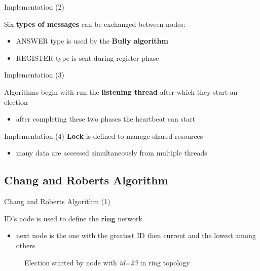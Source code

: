 \documentclass{beamer}
\begin{document}
	 \begin{frame}{Implementation (2)}
	 	 
	 	 Six \textbf{types of messages} can be exchanged between nodes:
	 	 
	 	 \lstIII
	 	 
	 	 \begin{itemize}
	 	     \item ANSWER type is used by the \textbf{Bully algorithm} 
	 	     \item REGISTER type is sent during register phase
	 	 \end{itemize}
	 	 
	 	 \end{frame}
	 	
	 \begin{frame}{Implementation (3)}
	 
	 Algorithms begin with run the \textbf{listening thread} after which they start an election
	 \begin{itemize}
	     \item after completing these two phases the heartbeat can start
	 \end{itemize}
    
    \lstIV
	     
	 \end{frame}
	 
	 \begin{frame}{Implementation (4)}
	     \textbf{Lock} is defined to manage shared resources
	     \begin{itemize}
	         \item many data are accessed simultaneously from multiple threads 
	     \end{itemize}
	     
	     \begin{center}
	     \lstV
	     \end{center}


	 \end{frame}
	 
	 \subsection{Chang and Roberts Algorithm}
	 
	 \begin{frame}{Chang and Roberts Algorithm (1)}
	  
	   ID's node is used to define the \textbf{ring} network 
	   \begin{itemize}
	       \item next node is the one with the greatest ID then current and the lowest among others
	   \end{itemize} 
	   
	   \begin{figure}
          \centering
          
          \caption{Election started by node with \textit{id=23} in ring topology}
        \end{figure}
        \end{frame}
        
\end{document}

